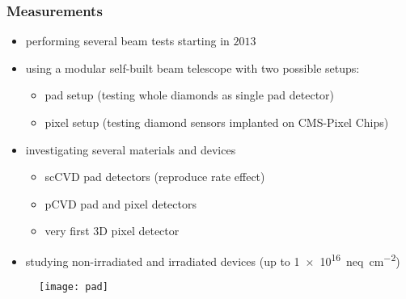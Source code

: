 \begin{frame}
	\frametitle{Measurements}
	\begin{itemize}
		\item performing several beam tests starting in $2013$
		\item using a modular self-built beam telescope with two possible setups:
			\begin{itemize}
				\item pad setup (testing whole diamonds as single pad detector)
				\item pixel setup (testing diamond sensors implanted on CMS-Pixel Chips)
			\end{itemize}
		\item investigating several materials and devices
		\begin{itemize}
			\item scCVD pad detectors (reproduce rate effect)
			\item pCVD pad and pixel detectors
			\item very first 3D pixel detector
		\end{itemize}
		\item studying non-irradiated and irradiated devices (up to \SI{1e16}{neq\per cm^2})
	\end{itemize}
	\begin{figure}
		\centering
		\texttt{[image: pad]}
	\end{figure}
\end{frame}
